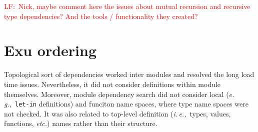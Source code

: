 \documentclass[runningheads,a4paper]{llncs}
\newcommand{\eg}{{\em e.\,g.,\/}}
\newcommand{\ie}{{\em i.\,e.,\/}}
\newcommand{\etc}{{\em etc.\/}}
\newcommand{\lfcomment}[1]{{\scriptsize\textcolor{red}{LF:~#1}}}
\begin{document}
\lfcomment{Nick, maybe comment here the issues about mutual recursion and recursive type dependencies? And the tools / functionality they created?}

\section{Exu ordering}\label{sec:exu}

Topological sort of dependencies worked inter modules and resolved the long load time issues. Nevertheless, it did not consider definitions within module themselves. Moreover, module dependency search did not consider local (\eg~\texttt{let-in} definitions) and funciton name spaces, where type name spaces were not checked. It was also related to top-level definition (\ie~types, values, functions, \etc) names rather than their structure.      
\end{document}
